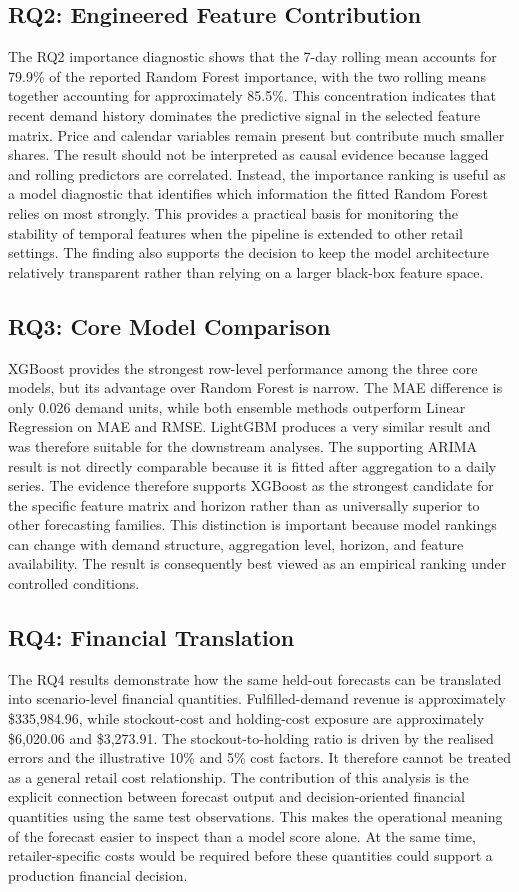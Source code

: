 \subsection{RQ2: Engineered Feature Contribution}
The RQ2 importance diagnostic shows that the 7-day rolling mean accounts for 79.9\% of the reported Random Forest importance, with the two rolling means together accounting for approximately 85.5\%.
This concentration indicates that recent demand history dominates the predictive signal in the selected feature matrix.
Price and calendar variables remain present but contribute much smaller shares.
The result should not be interpreted as causal evidence because lagged and rolling predictors are correlated.
Instead, the importance ranking is useful as a model diagnostic that identifies which information the fitted Random Forest relies on most strongly.
This provides a practical basis for monitoring the stability of temporal features when the pipeline is extended to other retail settings.
The finding also supports the decision to keep the model architecture relatively transparent rather than relying on a larger black-box feature space.

\subsection{RQ3: Core Model Comparison}
XGBoost provides the strongest row-level performance among the three core models, but its advantage over Random Forest is narrow.
The MAE difference is only 0.026 demand units, while both ensemble methods outperform Linear Regression on MAE and RMSE.
LightGBM produces a very similar result and was therefore suitable for the downstream analyses.
The supporting ARIMA result is not directly comparable because it is fitted after aggregation to a daily series.
The evidence therefore supports XGBoost as the strongest candidate for the specific feature matrix and horizon rather than as universally superior to other forecasting families.
This distinction is important because model rankings can change with demand structure, aggregation level, horizon, and feature availability.
The result is consequently best viewed as an empirical ranking under controlled conditions.

\subsection{RQ4: Financial Translation}
The RQ4 results demonstrate how the same held-out forecasts can be translated into scenario-level financial quantities.
Fulfilled-demand revenue is approximately \$335,984.96, while stockout-cost and holding-cost exposure are approximately \$6,020.06 and \$3,273.91.
The stockout-to-holding ratio is driven by the realised errors and the illustrative 10\% and 5\% cost factors.
It therefore cannot be treated as a general retail cost relationship.
The contribution of this analysis is the explicit connection between forecast output and decision-oriented financial quantities using the same test observations.
This makes the operational meaning of the forecast easier to inspect than a model score alone.
At the same time, retailer-specific costs would be required before these quantities could support a production financial decision.

